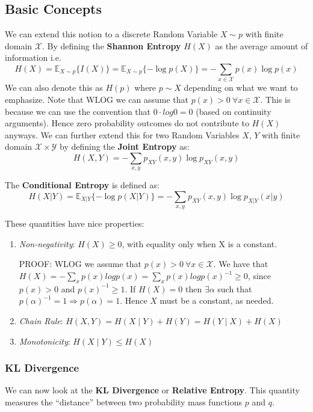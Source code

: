 \documentclass[]{article}
\theoremstyle{mattstyle}
\theoremstyle{definition}
\begin{document}
\subsection{Basic Concepts}
We can extend this notion to a discrete Random Variable $X\sim p$ with finite domain $\mathcal{X}$. By defining the \textbf{Shannon Entropy} $H(X)$ as the average amount of information i.e. 
\begin{equation}
H(X) = \mathbb{E}_{X\sim p}\{I(X)\} = \mathbb{E}_{X\sim p}\{-\log p(X)\} = -\sum_{x\in\mathcal{X}}p(x)\log p(x)
\end{equation}
We can also denote this as $H(p)$ where $p \sim X$ depending on what we want to emphasize. Note that WLOG we can assume that \(p(x)>0 \ \forall x\in\mathcal{X}\). This is because we can use the convention that \(0\cdot log0 = 0\) (based on continuity arguments). Hence zero probability outcomes do not contribute to $H(X)$ anyways. We can further extend this for two Random Variables $X$, $Y$ with finite domain \(\mathcal{X}\times\mathcal{Y}\) by defining the \textbf{Joint Entropy} as:
\begin{equation}
H(X,Y) = -\sum_{x,y}p_{XY}(x,y)\log p_{XY}(x,y)
\end{equation}

The \textbf{Conditional Entropy} is defined as:
\begin{equation}
H(X|Y) = \mathbb{E}_{X|Y}\{-\log p(X|Y)\} = -\sum_{x,y}p_{XY}(x,y)\log p_{X|Y}(x|y)
\end{equation}

These quantities have nice properties:
\begin{enumerate}
	\item \emph{Non-negativity}: \(H(X)\ge0\), with equality only when X is a constant.
	
	PROOF: WLOG we assume that \(p(x)>0 \ \forall x\in\mathcal{X}\). We have that \(H(X) = -\sum_{x} p(x)logp(x) = \sum_{x} p(x)logp(x)^{-1}\ge0\), since \(p(x)>0\) and \(p(x)^{-1} \ge 1\). If \(H(X)=0\) then \(\exists \alpha\) such that \(p(\alpha)^{-1}=1 \Rightarrow p(\alpha)=1\). Hence \(X\) must be a constant, as needed.
	
	\item \emph{Chain Rule}: $H(X,Y) = H(X \mid Y) + H(Y) = H(Y \mid X) + H(X)$ 
	\item \emph{Monotonicity}: $H(X\mid Y) \le H(X)$ 
\end{enumerate}

\subsubsection{KL Divergence}
We can now look at the \textbf{KL Divergence} or \textbf{Relative Entropy}. This quantity measures the ``distance'' between two probability mass functions $p$ and $q$.
\end{document}

